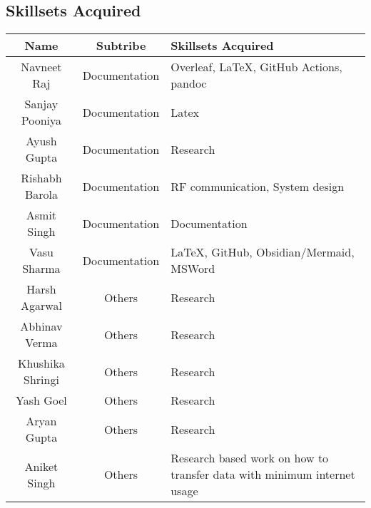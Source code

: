 \subsection{Skillsets Acquired}
\begin{center}
    \label{table:skillsets}
    \begin{longtable}{ | c | c | m{6cm} | }
        \hline
        \textbf{Name}              & \textbf{Subtribe} & \textbf{Skillsets Acquired}                                             \\
        \hline \hline
        Navneet Raj                & Documentation     & Overleaf, LaTeX, GitHub Actions, pandoc                                 \\
        \hline
        Sanjay Pooniya             & Documentation     & Latex                                                                   \\
        \hline
        Ayush Gupta                & Documentation     & Research                                                                \\
        \hline
        Rishabh Barola             & Documentation     & RF communication, System design                                         \\
        \hline
        Asmit Singh                & Documentation     & Documentation                                                           \\
        \hline
        Vasu Sharma                & Documentation     & LaTeX, GitHub, Obsidian/Mermaid, MSWord                                 \\
        \hline
        Harsh Agarwal              & Others            & Research                                                                \\
        \hline
        Abhinav Verma              & Others            & Research                                                                \\
        \hline
        Khushika Shringi           & Others            & Research                                                                \\
        \hline
        Yash Goel                  & Others            & Research                                                                \\
        \hline
        Aryan Gupta                & Others            & Research                                                                \\
        \hline
        Aniket Singh               & Others            & Research based work on how to transfer data with minimum internet usage \\
        \hline


\end{longtable}
\end{center}
